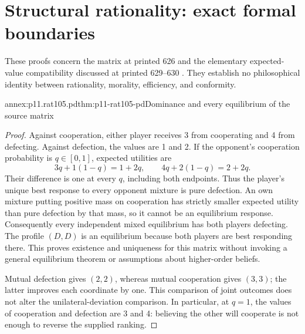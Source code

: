 \section{Structural rationality: exact formal boundaries}
\label{sec:p11-rat105-annex}

These proofs concern the matrix at printed 626 and the elementary
expected-value compatibility discussed at printed 629--630
\parencite{NidaRumelinGutwaldZuber2021}. They establish no philosophical
identity between rationality, morality, efficiency, and conformity.

\begin{annexitem}{annex:p11.rat105.pd}{thm:p11-rat105-pd}{Dominance and every equilibrium of the source matrix}
\begin{proof}
Against cooperation, either player receives 3 from cooperating and 4
from defecting. Against defection, the values are 1 and 2. If the
opponent's cooperation probability is \(q\in[0,1]\), expected utilities
are
\[
 3q+1(1-q)=1+2q,\qquad
 4q+2(1-q)=2+2q.
\]
Their difference is one at every \(q\), including both endpoints.
Thus the player's unique best response to every opponent mixture is
pure defection. An own mixture putting positive mass on cooperation
has strictly smaller expected utility than pure defection by that mass,
so it cannot be an equilibrium response. Consequently every independent
mixed equilibrium has both players defecting. The profile \((D,D)\)
is an equilibrium because both players are best responding there.
This proves existence and uniqueness for this matrix without invoking
a general equilibrium theorem or assumptions about higher-order beliefs.

Mutual defection gives \((2,2)\), whereas mutual cooperation gives
\((3,3)\); the latter improves each coordinate by one. This comparison
of joint outcomes does not alter the unilateral-deviation comparison.
In particular, at \(q=1\), the values of cooperation and defection
are 3 and 4: believing the other will cooperate is not enough to reverse
the supplied ranking.
\end{proof}
\end{annexitem}

